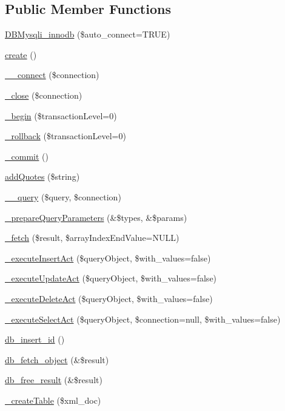 \subsection*{Public Member Functions}
\begin{DoxyCompactItemize}
\item 
\hyperlink{classDBMysqli__innodb_a0802ef8a893610ae107ca25b77080bcc}{D\-B\-Mysqli\-\_\-innodb} (\$auto\-\_\-connect=T\-R\-U\-E)
\item 
\hyperlink{classDBMysqli__innodb_a70756f753a255650d67931f06d675608}{create} ()
\item 
\hyperlink{classDBMysqli__innodb_ab6db4cf73da0e11ed0045a07d751e334}{\-\_\-\-\_\-connect} (\$connection)
\item 
\hyperlink{classDBMysqli__innodb_a566f80a95a8b1e84155feb0868a90c84}{\-\_\-close} (\$connection)
\item 
\hyperlink{classDBMysqli__innodb_aeb782ffae3a856c9b5b5d61e569c84f1}{\-\_\-begin} (\$transaction\-Level=0)
\item 
\hyperlink{classDBMysqli__innodb_a1d9fceb6fa47fd0dce5e2ca05635aafc}{\-\_\-rollback} (\$transaction\-Level=0)
\item 
\hyperlink{classDBMysqli__innodb_a0ec5faa054822bd226fa6c404b17e674}{\-\_\-commit} ()
\item 
\hyperlink{classDBMysqli__innodb_aaf7572b62d23465db5d7bba8930004fc}{add\-Quotes} (\$string)
\item 
\hyperlink{classDBMysqli__innodb_a02098642ca57c84b9061172e8a3b8d17}{\-\_\-\-\_\-query} (\$query, \$connection)
\item 
\hyperlink{classDBMysqli__innodb_a0955069ad72c16d2652573e5883f037d}{\-\_\-prepare\-Query\-Parameters} (\&\$types, \&\$params)
\item 
\hyperlink{classDBMysqli__innodb_ae3c56ef21f1ba07dfd602534544e6fc9}{\-\_\-fetch} (\$result, \$array\-Index\-End\-Value=N\-U\-L\-L)
\item 
\hyperlink{classDBMysqli__innodb_a7f76f4789d2a6b1614345c4c69071546}{\-\_\-execute\-Insert\-Act} (\$query\-Object, \$with\-\_\-values=false)
\item 
\hyperlink{classDBMysqli__innodb_ad45981920c2258e135292b1ffedaecfb}{\-\_\-execute\-Update\-Act} (\$query\-Object, \$with\-\_\-values=false)
\item 
\hyperlink{classDBMysqli__innodb_a3ba692ef0c7a7d89ba5c7deee0fdd601}{\-\_\-execute\-Delete\-Act} (\$query\-Object, \$with\-\_\-values=false)
\item 
\hyperlink{classDBMysqli__innodb_abae8c007e13d7811697dadb3f9ef3930}{\-\_\-execute\-Select\-Act} (\$query\-Object, \$connection=null, \$with\-\_\-values=false)
\item 
\hyperlink{classDBMysqli__innodb_aec47da41558bdf42e9d2fe31c2ce87f2}{db\-\_\-insert\-\_\-id} ()
\item 
\hyperlink{classDBMysqli__innodb_a676cdff9d50d9398c0c2e3f9d50e8c0a}{db\-\_\-fetch\-\_\-object} (\&\$result)
\item 
\hyperlink{classDBMysqli__innodb_a0eb1700db91867677a8f7fa9e2f25298}{db\-\_\-free\-\_\-result} (\&\$result)
\item 
\hyperlink{classDBMysqli__innodb_adea880ad43bc281fbdae806bd25d6cce}{\-\_\-create\-Table} (\$xml\-\_\-doc)
\end{DoxyCompactItemize}
